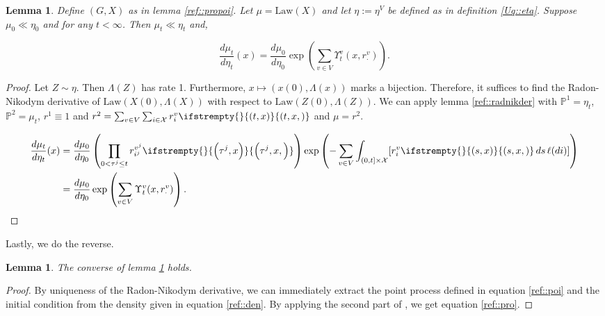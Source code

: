 \documentclass[12pt]{article}
\newcommand{\mb}{\mathbb}
\newcommand{\mc}{\mathcal}
\newcommand{\te}{\text}
\newcommand{\pr}{\mb{P}}							%
\newcommand{\defeq}{:=}								%
\newcommand{\sta}{\mc{X}}							%
\newcommand{\Xf}{X}									%
\newcommand{\Sm}{\ell}								%
\newcommand{\rate}{r}								%
\newcommand{\m}{\mu}								%
\newcommand{\xf}{x}									%
\newcommand{\tme}[1]{(#1)}							%
\newcommand{\vpara}[1]{^{#1}}						%
\newcommand{\stpara}[1]{_{#1}}						%
\newcommand{\tpara}[1]{_{#1}}						%
\newcommand{\tmepro}[3]{
\ifstrempty{#3}{
	\left(#1,#2\right)}{
	\left(#1,#2,#3\right)}}							%
\newcommand{\pmap}{\Lambda}							%
\newcommand{\rt}{\tau}								%
\newcommand{\law}{\te{Law}}							%
\newcommand{\Xh}{Z}									%
\newcommand{\mmm}{\eta}								%
\newcommand{\ds}{\Upsilon}							%
\newtheorem{lem}[thms]{Lemma}
\begin{document}
\begin{lem}
Define \((G,\Xf)\) as in lemma \ref{ref::propoi}. Let \(\m = \law(\Xf)\) and let \(\mmm \defeq \mmm\vpara{V}\) be defined as in definition \ref{Uq::eta}. Suppose \(\m\tpara{0} \ll \mmm\tpara{0}\) and for any \(t < \infty\). Then \(\m\tpara{t}\ll \mmm\tpara{t}\) and,

\begin{equation}
\frac{d\m\tpara{t}}{d\mmm\tpara{t}}(\xf) = \frac{d\m\tpara{0}}{d\mmm\tpara{0}}\exp\left(\sum_{v\in V} \ds\vpara{v}\tpara{t}(\xf,\rate\vpara{v}\stpara{\cdot})\right).
\label{ref::den}
\end{equation}
\label{ref::proden}
\end{lem}
\begin{proof}
Let \(\Xh \sim \mmm\). Then \(\pmap(\Xh)\) has rate 1. Furthermore, \(\xf \mapsto (\xf\tme{0},\pmap(\xf))\) marks a bijection. Therefore, it suffices to find the Radon-Nikodym derivative of \(\law(\Xf\tme{0},\pmap(\Xf))\) with respect to \(\law(\Xh\tme{0},\pmap(\Xh))\). We can apply lemma \ref{ref::radnikder} with \(\pr^1 = \mmm\tpara{t}\), \(\pr^2 = \m\tpara{t}\), \(\rate^1 \equiv 1\) and \(\rate^2 = \sum_{v \in V}\sum_{i\in\sta}\rate\vpara{v}\stpara{i}\tmepro{t}{\xf}{}\) and \(\m = \rate^2\).

\begin{align*}
\frac{d\m\tpara{t}}{d\mmm\tpara{t}}(\xf) &= \frac{d\m\tpara{0}}{d\mmm\tpara{0}}\left(\prod_{0 < \rt^j \leq t} \rate\vpara{v^j}\stpara{i^j}\tmepro{\rt^j}{\xf}{}\right)\exp\left(-\sum_{v \in V}\int_{(0,t]\times\sta}[\rate\vpara{v}\stpara{i}\tmepro{s}{\xf}{}\,ds\,\Sm(di)] \right)\\
&=\frac{d\m\tpara{0}}{d\mmm\tpara{0}}\exp\left(\sum_{v \in V}\ds\vpara{v}\tpara{t}(\xf,\rate\vpara{v}\stpara{\cdot}) \right).
\end{align*}
\end{proof}

Lastly, we do the reverse.

\begin{lem}
The converse of lemma \ref{ref::proden} holds.
\label{ref::denpro}
\end{lem}
\begin{proof}
By uniqueness of the Radon-Nikodym derivative, we can immediately extract the point process defined in equation \eqref{ref::poi} and the initial condition from the density given in equation \eqref{ref::den}. By applying the second part of \cite[exercise 14.7.I]{DalVer08}, we get equation \eqref{ref::pro}.
\end{proof}
\end{document}
